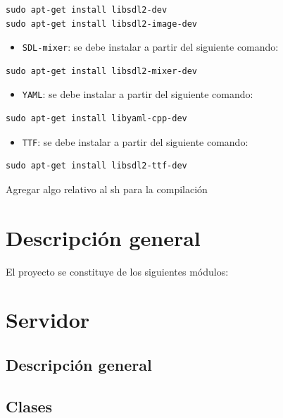 \documentclass[a4paper]{article}
\begin{document}
\begin{verbatim}
sudo apt-get install libsdl2-dev
sudo apt-get install libsdl2-image-dev
\end{verbatim}

\begin{itemize}
	\item \texttt{SDL-mixer}: se debe instalar a partir del siguiente comando:
\end{itemize}

\begin{verbatim}
sudo apt-get install libsdl2-mixer-dev
\end{verbatim}

\begin{itemize}
	\item \texttt{YAML}: se debe instalar a partir del siguiente comando:
\end{itemize}

\begin{verbatim}
sudo apt-get install libyaml-cpp-dev
\end{verbatim}

\begin{itemize}
	\item \texttt{TTF}: se debe instalar a partir del siguiente comando:
\end{itemize}

\begin{verbatim}
sudo apt-get install libsdl2-ttf-dev
\end{verbatim}

Agregar algo relativo al sh para la compilación

\section{Descripción general}

El proyecto se constituye de los siguientes módulos:

\section{Servidor}

\subsection{Descripción general}

\subsection{Clases}
\end{document}
